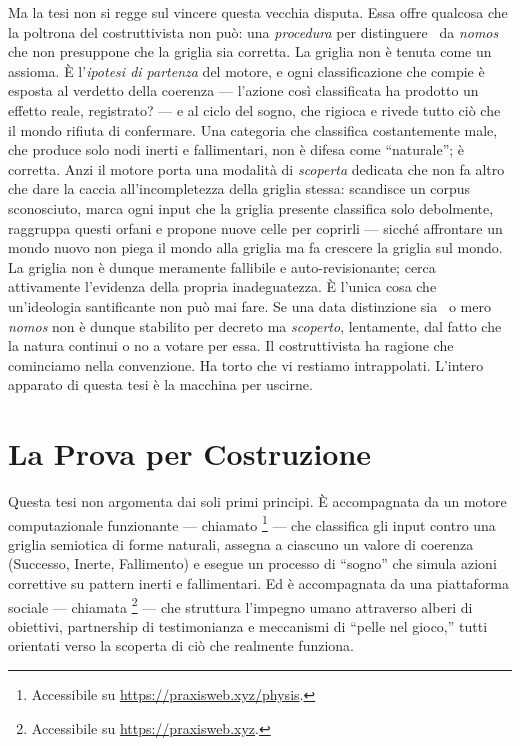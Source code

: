 Ma la tesi non si regge sul vincere questa vecchia disputa. Essa offre qualcosa
che la poltrona del costruttivista non pu\`o: una \emph{procedura} per
distinguere \physis\ da \emph{nomos} che non presuppone che la griglia sia
corretta. La griglia non \`e tenuta come un assioma. \`E l'\emph{ipotesi di
partenza} del motore, e ogni classificazione che compie \`e esposta al verdetto
della coerenza --- l'azione cos\`i classificata ha prodotto un effetto reale,
registrato? --- e al ciclo del sogno, che rigioca e rivede tutto ci\`o che il
mondo rifiuta di confermare. Una categoria che classifica costantemente male,
che produce solo nodi inerti e fallimentari, non \`e difesa come ``naturale'';
\`e corretta. Anzi il motore porta una modalit\`a di \emph{scoperta} dedicata che
non fa altro che dare la caccia all'incompletezza della griglia stessa: scandisce
un corpus sconosciuto, marca ogni input che la griglia presente classifica solo
debolmente, raggruppa questi orfani e propone nuove celle per coprirli --- sicch\'e
affrontare un mondo nuovo non piega il mondo alla griglia ma fa crescere la griglia
sul mondo. La griglia non \`e dunque meramente fallibile e auto-revisionante;
cerca attivamente l'evidenza della propria inadeguatezza. \`E l'unica cosa che
un'ideologia santificante non pu\`o mai fare. Se una data
distinzione sia \physis\ o mero \emph{nomos} non \`e dunque stabilito per
decreto ma \emph{scoperto}, lentamente, dal fatto che la natura continui o no a
votare per essa. Il costruttivista ha ragione che cominciamo nella convenzione.
Ha torto che vi restiamo intrappolati. L'intero apparato di questa tesi \`e la
macchina per uscirne.

\section{La Prova per Costruzione}

Questa tesi non argomenta dai soli primi principi. \`E accompagnata da un
motore computazionale funzionante --- chiamato \physis\footnote{Accessibile su
\url{https://praxisweb.xyz/physis}.} --- che classifica
gli input contro una griglia semiotica di forme naturali, assegna a ciascuno
un valore di coerenza (Successo, Inerte, Fallimento) e esegue un processo
di ``sogno'' che simula azioni correttive su pattern inerti e fallimentari.
Ed \`e accompagnata da una piattaforma sociale --- chiamata \praxis\footnote{Accessibile su
\url{https://praxisweb.xyz}.} ---
che struttura l'impegno umano attraverso alberi di obiettivi, partnership
di testimonianza e meccanismi di ``pelle nel gioco,'' tutti orientati
verso la scoperta di ci\`o che realmente funziona.

